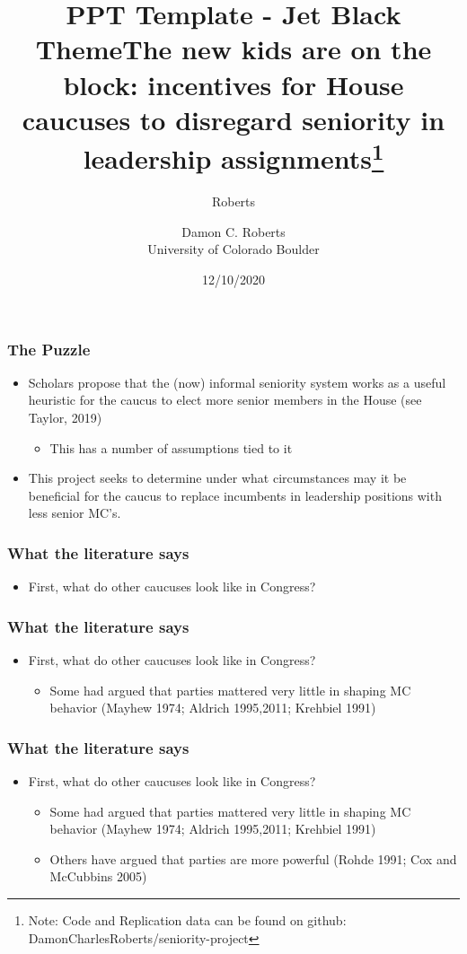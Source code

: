 \documentclass[notheorems, aspectratio=54]{beamer}
\title[Jet Black Theme]{PPT Template - Jet Black Theme}
\author{Roberts}
\institute[]{damon.roberts-1@colorado.edu}
\title[University of Colorado Boulder]{The new kids are on the block: incentives for House caucuses to disregard seniority in leadership assignments\footnote{Note: Code and Replication data can be found on github: DamonCharlesRoberts/seniority-project}}
\author[\copyright\ Roberts 2020]{
Damon C. Roberts\\ \bigskip 
{\small University of Colorado Boulder} }
\date{12/10/2020}
\begin{document}
\frame{\titlepage}


\begin{frame}\frametitle{The Puzzle}
	\begin{itemize}\setlength\itemsep{1em}
		\item Scholars propose that the (now) informal seniority system works as a useful heuristic for the caucus to elect more senior members in the House (see Taylor, 2019)
			\begin{itemize}
				\item This has a number of assumptions tied to it
			\end{itemize}
		\item This project seeks to determine under what circumstances may it be beneficial for the caucus to replace incumbents in leadership positions with less senior MC's.
	\end{itemize}	
\end{frame}

\begin{frame}\frametitle{What the literature says}
	\begin{itemize}\setlength\itemsep{1em}
		\item First, what do other caucuses look like in Congress?
	\end{itemize}
\end{frame}

\begin{frame}\frametitle{What the literature says}
	\begin{itemize}\setlength\itemsep{1em}
		\item First, what do other caucuses look like in Congress?
		\begin{itemize}
			\item Some had argued that parties mattered very little in shaping MC behavior (Mayhew 1974; Aldrich 1995,2011; Krehbiel 1991)
		\end{itemize}
	\end{itemize}
\end{frame}

\begin{frame}\frametitle{What the literature says}
	\begin{itemize}\setlength\itemsep{1em}
		\item First, what do other caucuses look like in Congress?
		\begin{itemize}
			\item Some had argued that parties mattered very little in shaping MC behavior (Mayhew 1974; Aldrich 1995,2011; Krehbiel 1991)
			\item Others have argued that parties are more powerful (Rohde 1991; Cox and McCubbins 2005)
		\end{itemize}
	\end{itemize}
\end{frame}
\end{document}
